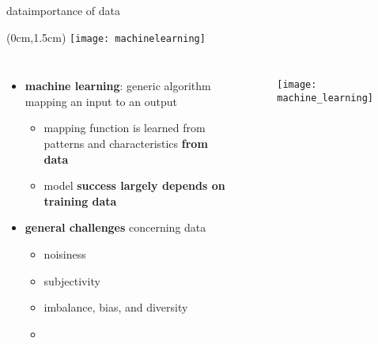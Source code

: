 \begin{frame}{data}{importance of data}
    \vspace{-5mm}
    \begin{textblock*}{100mm}(0cm,1.5cm)
        \texttt{[image: machinelearning]}
    \end{textblock*}           
    
    \begin{columns}
    \begin{itemize}
 
        \item<1->   \textbf{machine learning}: generic algorithm mapping an input to an output
            \begin{itemize}
                \item<2->   mapping function is learned from patterns and characteristics \textbf{from data}
                \item<2->[$\Rightarrow$]   model \textbf{success largely depends on training data}
                
            \end{itemize}
        \bigskip
        \item<3->   \textbf{general challenges} concerning data
            \begin{itemize}
                \item   noisiness
                \item   subjectivity
                \item   imbalance, bias, and diversity
                \item   {}
            \end{itemize}
    \end{itemize}
        \begin{figure}
            \texttt{[image: machine\_learning]}
        \end{figure}
    \end{columns}
\end{frame}

